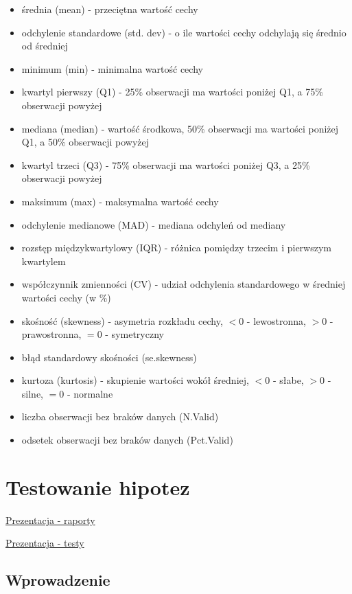 \documentclass[
]{book}
\providecommand{\tightlist}{%
  \setlength{\itemsep}{0pt}\setlength{\parskip}{0pt}}
\begin{document}
\begin{itemize}
\tightlist
\item
  średnia (mean) - przeciętna wartość cechy
\item
  odchylenie standardowe (std. dev) - o ile wartości cechy odchylają się średnio od średniej
\item
  minimum (min) - minimalna wartość cechy
\item
  kwartyl pierwszy (Q1) - 25\% obserwacji ma wartości poniżej Q1, a 75\% obserwacji powyżej
\item
  mediana (median) - wartość środkowa, 50\% obserwacji ma wartości poniżej Q1, a 50\% obserwacji powyżej
\item
  kwartyl trzeci (Q3) - 75\% obserwacji ma wartości poniżej Q3, a 25\% obserwacji powyżej
\item
  maksimum (max) - maksymalna wartość cechy
\item
  odchylenie medianowe (MAD) - mediana odchyleń od mediany
\item
  rozstęp międzykwartylowy (IQR) - różnica pomiędzy trzecim i pierwszym kwartylem
\item
  współczynnik zmienności (CV) - udział odchylenia standardowego w średniej wartości cechy (w \%)
\item
  skośność (skewness) - asymetria rozkładu cechy, \(< 0\) - lewostronna, \(> 0\) - prawostronna, \(= 0\) - symetryczny
\item
  błąd standardowy skośności (se.skewness)
\item
  kurtoza (kurtosis) - skupienie wartości wokół średniej, \(< 0\) - słabe, \(> 0\) - silne, \(= 0\) - normalne
\item
  liczba obserwacji bez braków danych (N.Valid)
\item
  odsetek obserwacji bez braków danych (Pct.Valid)
\end{itemize}

\hypertarget{testowanie-hipotez}{%
\chapter{Testowanie hipotez}\label{testowanie-hipotez}}

\href{presentations/02_raporty.html}{Prezentacja - raporty}

\href{presentations/03_testy.html}{Prezentacja - testy}

\hypertarget{wprowadzenie-1}{%
\section{Wprowadzenie}\label{wprowadzenie-1}}
\end{document}
